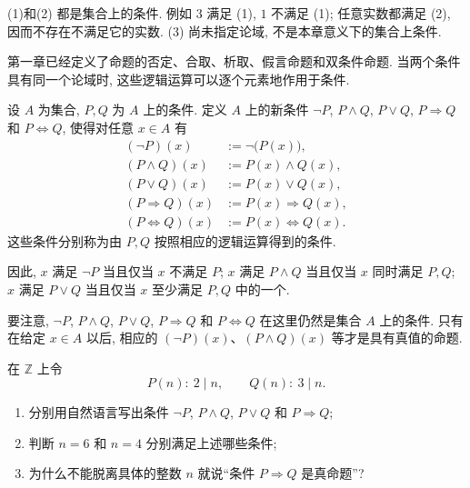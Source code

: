 \documentclass[usesamecnt, thmcnt=section, lang=cn, newtx, 10pt, scheme=chinese]{elegantbook}
\begin{document}
\begin{solution}
(1)和(2) 都是集合上的条件. 例如 $3$ 满足 (1), $1$ 不满足 (1); 任意实数都满足 (2), 因而不存在不满足它的实数. (3) 尚未指定论域, 不是本章意义下的集合上条件.
\end{solution}

第一章已经定义了命题的否定、合取、析取、假言命题和双条件命题. 当两个条件具有同一个论域时, 这些逻辑运算可以逐个元素地作用于条件.

\begin{definition}[条件的逻辑运算]\label{def:sets-condition-logic}
设 $A$ 为集合, $P,Q$ 为 $A$ 上的条件.  定义 $A$ 上的新条件 $\neg P$, $P\wedge Q$, $P\vee Q$, $P\Rightarrow Q$ 和 $P\Leftrightarrow Q$, 使得对任意 $x\in A$ 有
\[
\begin{aligned}
 (\neg P)(x)&:=\neg\bigl(P(x)\bigr),\\
 (P\wedge Q)(x)&:=P(x)\wedge Q(x),\\
 (P\vee Q)(x)&:=P(x)\vee Q(x),\\
 (P\Rightarrow Q)(x)&:=P(x)\Rightarrow Q(x),\\
 (P\Leftrightarrow Q)(x)&:=P(x)\Leftrightarrow Q(x).
\end{aligned}
\]
这些条件分别称为由 $P,Q$ 按照相应的逻辑运算得到的条件.

因此, $x$ 满足 $\neg P$ 当且仅当 $x$ 不满足 $P$; $x$ 满足 $P\wedge Q$ 当且仅当 $x$ 同时满足 $P,Q$; $x$ 满足 $P\vee Q$ 当且仅当 $x$ 至少满足 $P,Q$ 中的一个.

要注意, $\neg P$, $P\wedge Q$, $P\vee Q$, $P\Rightarrow Q$ 和 $P\Leftrightarrow Q$ 在这里仍然是集合 $A$ 上的条件. 只有在给定 $x\in A$ 以后, 相应的 $(\neg P)(x)$、$(P\wedge Q)(x)$ 等才是具有真值的命题.
\end{definition}

\begin{concept}\label{con:sets-condition-logic}
在 $\mathbb Z$ 上令
\[
 P(n):\ 2\mid n,
 \qquad
 Q(n):\ 3\mid n.
\]
\begin{enumerate}[label=\rm(\arabic*)]
  \item 分别用自然语言写出条件 $\neg P$, $P\wedge Q$, $P\vee Q$ 和 $P\Rightarrow Q$;
  \item 判断 $n=6$ 和 $n=4$ 分别满足上述哪些条件;
  \item 为什么不能脱离具体的整数 $n$ 就说``条件 $P\Rightarrow Q$ 是真命题''?
\end{enumerate}
\end{concept}
\end{document}
